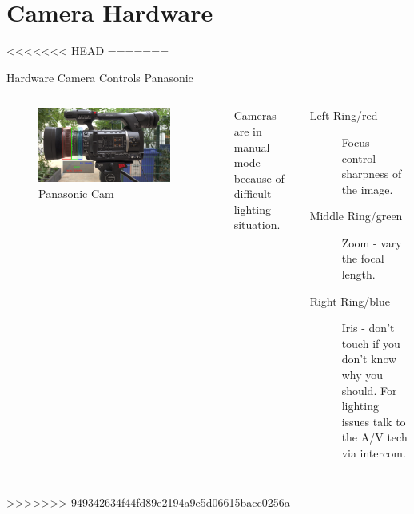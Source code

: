 \documentclass[aspectratio=169]{beamer}
\begin{document}
\section{Camera Hardware}
<<<<<<< HEAD
=======
\begin{frame}{Hardware Camera Controls Panasonic}
	\begin{columns}[T,onlytextwidth]
	\begin{figure} 
		\centering
		\includegraphics[width=0.9\textwidth]{images/panasonic_seitenansicht_objektiv.png}
		\caption{Panasonic Cam}
	\end{figure}
		Cameras are in manual mode because of difficult lighting situation.
		\begin{description}
			\item[Left Ring/red] Focus - control sharpness of the image.
			\item[Middle Ring/green] Zoom - vary the focal length.
			\item[Right Ring/blue] Iris - don't touch if you don't know why you should. For lighting issues talk to the A/V tech via intercom.%
		\end{description}
	\end{columns}
\end{frame}
>>>>>>> 949342634f44fd89e2194a9e5d06615bacc0256a
\end{document}
